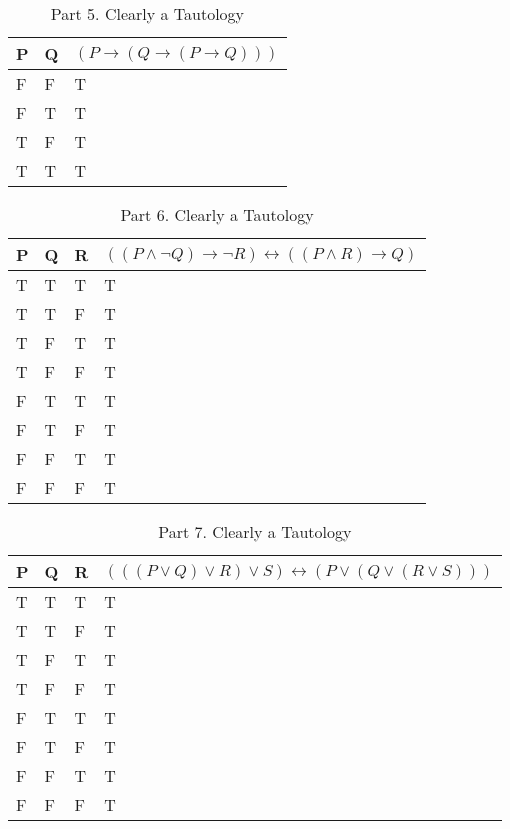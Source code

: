 \documentclass[12pt]{article}
\newenvironment{solution}[2][Solution]{ \begin{trivlist}
\item[\hskip \labelsep {\bfseries #1}]}{\end{trivlist}}
\begin{document}
\begin{solution}{2}
\begin{table}[!h]
\centering
\caption{Part 5. Clearly a Tautology}
\label{my-label}
\begin{tabular}{|l|l|l|}
\hline
P & Q & $(P \rightarrow (Q \rightarrow (P \rightarrow Q)))$ \\ \hline
F & F & T \\ \hline
F & T & T \\ \hline
T & F & T \\ \hline
T & T & T \\ \hline
\end{tabular}
\end{table}

\begin{table}[!h]
\centering
\caption{Part 6. Clearly a Tautology}
\label{my-label}
\begin{tabular}{|l|l|l|l|}
\hline
P & Q & R & $((P \wedge \lnot Q) \rightarrow \lnot R) \leftrightarrow ((P \wedge R) \rightarrow Q)$ \\ \hline
T & T & T & T \\ \hline
T & T & F & T \\ \hline
T & F & T & T \\ \hline
T & F & F & T \\ \hline
F & T & T & T \\ \hline
F & T & F & T \\ \hline
F & F & T & T \\ \hline
F & F & F & T \\ \hline
\end{tabular}
\end{table}

\begin{table}[!h]
\centering
\caption{Part 7. Clearly a Tautology}
\label{my-label}
\begin{tabular}{|l|l|l|l|}
\hline
P & Q & R & $(((P \vee Q) \vee R) \vee S) \leftrightarrow (P \vee (Q \vee (R \vee S)))$ \\ \hline
T & T & T & T \\ \hline
T & T & F & T \\ \hline
T & F & T & T \\ \hline
T & F & F & T \\ \hline
F & T & T & T \\ \hline
F & T & F & T \\ \hline
F & F & T & T \\ \hline
F & F & F & T \\ \hline
\end{tabular}
\end{table}


\end{solution}
\end{document}
